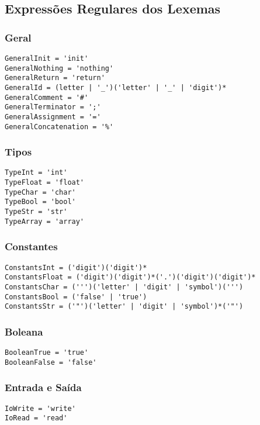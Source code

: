 \documentclass[a4paper,12pt]{article}
\begin{document}
\pagebreak

\subsection*{Expressões Regulares dos Lexemas}
\subsubsection*{Geral}
\begin{lstlisting}
GeneralInit = 'init'
GeneralNothing = 'nothing'
GeneralReturn = 'return'
GeneralId = (letter | '_')('letter' | '_' | 'digit')*
GeneralComment = '#'
GeneralTerminator = ';'
GeneralAssignment = '='
GeneralConcatenation = '%'
\end{lstlisting}

\hfill

\subsubsection*{Tipos}
\begin{lstlisting}
TypeInt = 'int'
TypeFloat = 'float'
TypeChar = 'char'
TypeBool = 'bool'
TypeStr = 'str'
TypeArray = 'array'
\end{lstlisting}

\hfill

\subsubsection*{Constantes}
\begin{lstlisting}
ConstantsInt = ('digit')('digit')*
ConstantsFloat = ('digit')('digit')*('.')('digit')('digit')*
ConstantsChar = (''')('letter' | 'digit' | 'symbol')(''')
ConstantsBool = ('false' | 'true') 
ConstantsStr = ('"')('letter' | 'digit' | 'symbol')*('"')
\end{lstlisting}

\hfill

\subsubsection*{Boleana}
\begin{lstlisting}
BooleanTrue = 'true'
BooleanFalse = 'false'
\end{lstlisting}

\hfill

\subsubsection*{Entrada e Saída}
\begin{lstlisting}
IoWrite = 'write'
IoRead = 'read'
\end{lstlisting}
\end{document}
